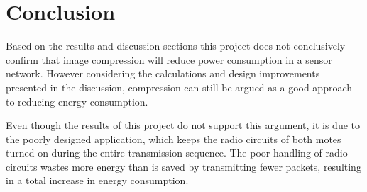 \chapter{Conclusion}
Based on the results and discussion sections this project does not conclusively confirm that image compression will reduce power consumption in a sensor network. 
However considering the calculations and design improvements presented in the discussion, compression can still be argued as a good approach to reducing energy consumption.
 
Even though the results of this project do not support this argument, it is due to the poorly designed application, which keeps the radio circuits of both motes turned on during the entire transmission sequence.
The poor handling of radio circuits wastes more energy than is saved by transmitting fewer packets, resulting in a total increase in energy consumption. 
